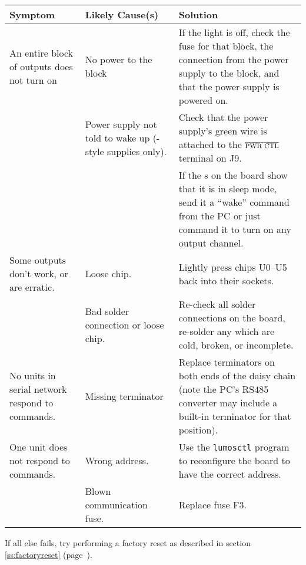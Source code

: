 \documentclass[letterpaper,twoside,onecolumn,openright,final]{memoir}
\begin{document}
\begin{longtable}{|p{1.5in}|p{1.5in}|p{2in}|}\hline
\bfseries Symptom & \bfseries Likely Cause(s) & \bfseries Solution \\\hline\hline
\endhead
An entire block of outputs does not turn on 
	& No power to the block 
	& If the \mc{BLOCK PWR} light is off, check the fuse for that block, 
	  the connection from the power supply to the block, and that the power supply is powered on.\\
\cline{2-3}
	& Power supply not told to wake up (\mc{ATX}-style supplies only).
	& Check that the power supply's green wire is attached to the $\overline{\hbox{\mc{PWR CTL}}}$
	  terminal on J9. \\
\cline{3-3}
	&& If the \acronym{LED}s on the board show that it is in sleep mode,  send it a ``wake'' command
	from the PC or just command it to turn on any output channel.
\\\hline
Some outputs don't work, or are erratic.
	& Loose %
chip.
	& Lightly press chips U0--U5 back into their sockets.\\
\cline{2-3}
	& Bad solder connection or loose chip.
	& Re-check all solder connections on the board, re-solder any which are cold, broken, or
	  incomplete.\\\hline
No units in serial network respond to commands.
	& Missing terminator
	& Replace terminators on both ends of the daisy chain (note the PC's RS485 converter
	  may include a built-in terminator for that position).\\\hline
One unit does not respond to commands.
	& Wrong address.
	& Use the \verb+lumosctl+ program to reconfigure the board to have
	  the correct address.\\
\cline{2-3}
	& Blown communication fuse.
	& Replace fuse F3.\\\hline
\end{longtable}

If all else fails, try performing a factory reset as described in section \ref{ss:factoryreset} (page~\pageref{ss:factoryreset}).
\end{document}

